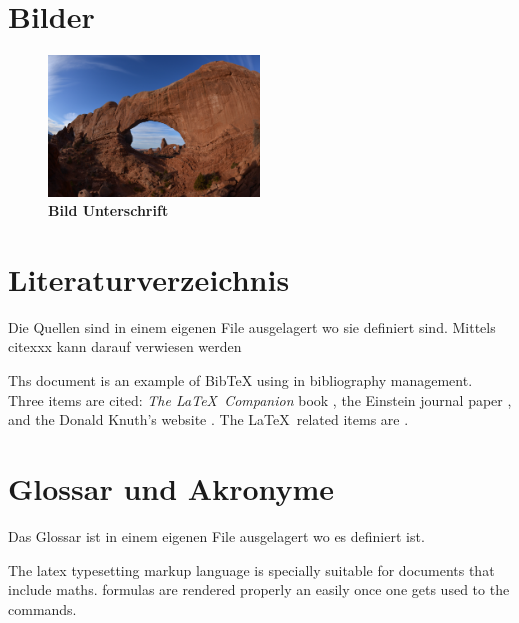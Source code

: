 \section{Bilder}
\begin{figure}[htbp]
	\begin{center}
	\includegraphics[width=0.50\textwidth]{./images/sampleImage.jpg}
	\caption{\textbf{Bild Unterschrift}}
	\label{Bild Referenz}
	\end{center}
\end{figure}

\section{Literaturverzeichnis}
Die Quellen sind in einem eigenen File ausgelagert wo sie definiert sind. Mittels \\cite{xxx} kann darauf verwiesen werden

Ths document is an example of BibTeX using in bibliography management. Three items
are cited: \textit{The \LaTeX\ Companion} book \cite{latexcompanion}, the Einstein
journal paper \cite{einstein}, and the Donald Knuth's website \cite{knuthwebsite}.
The \LaTeX\ related items are \cite{latexcompanion,knuthwebsite}.

\section{Glossar und Akronyme}
Das Glossar ist in einem eigenen File ausgelagert wo es definiert ist.

The \Gls{latex} typesetting markup language is specially suitable
for documents that include \gls{maths}. \Glspl{formula} are
rendered properly an easily once one gets used to the commands.
